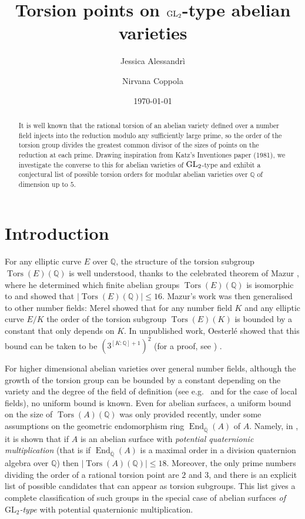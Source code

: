 \documentclass[a4paper,11pt]{amsart}
\title{Torsion points on \(\GL_2\)-type abelian varieties}
\date{\today}
\author[J. Alessandrì]{Jessica Alessandrì}
\author[N. Coppola]{Nirvana Coppola}
\theoremstyle{definition}
\newcommand{\Q}{\mathbb Q}
\newcommand{\GL}{\text{GL}}
\DeclareMathOperator{\End}{End}
\DeclareMathOperator{\Tors}{Tors}
\begin{document}
\begin{abstract}
It is well known that the rational torsion of an abelian variety defined over a number field injects into the reduction modulo any sufficiently large prime, so the order of the torsion group divides the greatest common divisor of the sizes of points on the reduction at each prime. Drawing inspiration from Katz's Inventiones paper (1981), we investigate the converse to this for abelian varieties of \(\rm GL_2\)-type and exhibit a conjectural list of possible torsion orders for modular abelian varieties over \(\mathbb Q\) of dimension up to \(5\).
\end{abstract}

\maketitle

\section{Introduction}\label{sec:intro}
For any elliptic curve \(E\) over \(\Q\), the structure of the torsion subgroup \(\Tors(E)(\Q)\) is well understood, thanks to the celebrated theorem of Mazur \cite[Theorem 8]{Mazur1977ModularIdeal}, where he determined which finite abelian groups \(\Tors(E)(\Q)\) is isomorphic to and showed that \(|\Tors(E)(\Q)| \leq 16\).
Mazur's work was then generalised to other number fields: Merel \cite{Merel1996BornesNombres} showed that for any number field \(K\) and any elliptic curve \(E/K\) the order of the torsion subgroup \(\Tors(E)(K)\) is bounded by a constant that only depends on \(K\). In unpublished work, Oesterl\'e \cite{Oesterle1994TorsionNombres} showed that this bound can be taken to be \((3^{[K:\Q]+1})^2\) (for a proof, see \cite[Appendix A]{Derickx2016TorsionPublications}) .

For higher dimensional abelian varieties over general number fields, although the growth of the torsion group can be bounded by a constant depending on the variety and the degree of the field of definition (see e.g.\ \cite{Fourn2022TorsionField} and \cite{Clark2008LocalVarieties} for the case of local fields), no uniform bound is known.
Even for abelian surfaces, a uniform bound on the size of \(\Tors(A)(\Q)\) was only provided recently, under some assumptions on the geometric endomorphism ring \(\End_{\overline{\Q}}(A)\) of \(A\). Namely, in \cite{Laga2024RationalMultiplication}, it is shown that if \(A\) is an abelian surface with \emph{potential quaternionic multiplication} (that is if \(\End_{\overline{\Q}}(A)\) is a maximal order in a division quaternion algebra over \(\Q\)) then \(|\Tors(A)(\Q)| \leq 18\). Moreover, the only prime numbers dividing the order of a rational torsion point are \(2\) and \(3\), and there is an explicit list of possible candidates that can appear as torsion subgroups. This list gives a complete classification of such groups in the special case of abelian surfaces \emph{of \(\GL_2\)-type} with potential quaternionic multiplication.
\end{document}
